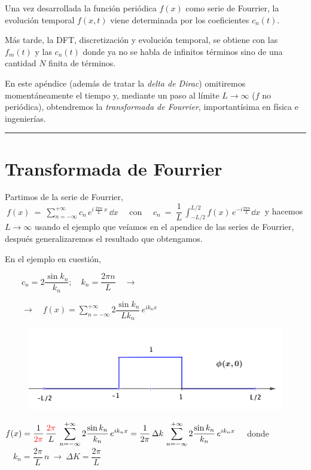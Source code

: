 Una vez desarrollada la función periódica $f(x)$ como serie de Fourrier, la evolución temporal $f(x,t)$ viene determinada por  los coeficientes $c_n(t)$.

Más tarde, la DFT, discretización y evolución temporal,  se obtiene con las $f_m(t)$ y las $c_n(t)$ donde ya no se habla de infinitos términos sino de una cantidad $N$ finita de términos.

En este apéndice (además de tratar la \emph{delta de Dirac}) omitiremos momentáneamente el tiempo y, mediante un paso al límite $L\to \infty$ ($f$ no periódica), obtendremos la \emph{transformada de Fourrier}, importantísima en física e ingenierías.

\begin{center}\rule{200pt}{0.1pt}\end{center}

\section{Transformada de Fourrier}

Partimos de la serie de Fourrier, $\ f(x) \ = \ \displaystyle \sum_{n=-\infty}^{+\infty} c_n\, e^{i\, \frac{2\pi n}{L}\, x}\, \dd x \quad \text{ con } \quad c_n \ = \ \dfrac 1 L \, \int_{-L/2}^{L/2} f(x)\, e^{-i \frac{2\pi n}{L}} \dd x\ $ y hacemos $L\to \infty$ usando el ejemplo que veíamos en el apendice de las series de Fourrier, después generalizaremos el resultado que obtengamos.

En el ejemplo en cuestión,


\begin{multicols}{2}
$\qquad c_n=2\dfrac{\sin k_n}{k_n}; \quad k_n=\dfrac{2\pi n}{L} \quad \to $

$\qquad \to \quad f(x)=\displaystyle \sum_{n=-\infty}^{+\infty} 2 \dfrac{\sin k_n}{L k_n} \, e^{ik_n x}$	
\begin{figure}[H]
	\centering
	\includegraphics[width=.5\textwidth]{imagenes/apendices-01-14.png}
\end{figure}
\end{multicols}

 
$f(x)=\dfrac{1}{\textcolor{red}{2\pi}} \displaystyle \, \dfrac{\textcolor{red}{2\pi}}{L} \, \sum_{n=-\infty}^{+\infty} 2 \dfrac{\sin k_n} {k_n} \, e^{ik_n x} = \dfrac 1{2\pi}\, \Delta k \, \sum_{n=-\infty}^{+\infty} 2 \dfrac{\sin k_n}{k_n} \, e^{ik_n x}\quad $ donde $\quad k_n=\dfrac{2\pi}{L}\, n \ \to \ \Delta K=\dfrac{2\pi}{L}$


